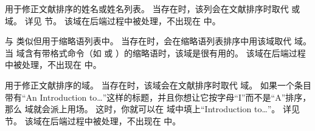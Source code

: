 \begin{fieldlist}



用于修正文献排序的姓名或姓名列表。
当存在时，该列会在文献排序时取代   或  域。
详见  节。
该域在后端过程中被处理，不出现在  中。




与  类似但用于缩略语列表中。
当存在时，\biblatex 会在缩略语列表排序中用该域取代  域。
当  域含有带格式命令（如  或 ）的缩略语时，该域是很有用的。
该域在后端过程中被处理，不出现在  中。




用于修正文献排序的域。
当存在时，该域会在文献排序时取代  域。
如果一个条目带有“An Introduction to\dots”这样的标题，并且你想让它按字母“I”而不是“A”排序，那么  域就会派上用场。
这时，你就可以在  域中填上“Introduction to\dots”。
详见  节。
该域在后端过程中被处理，不出现在  中。


\end{fieldlist}
